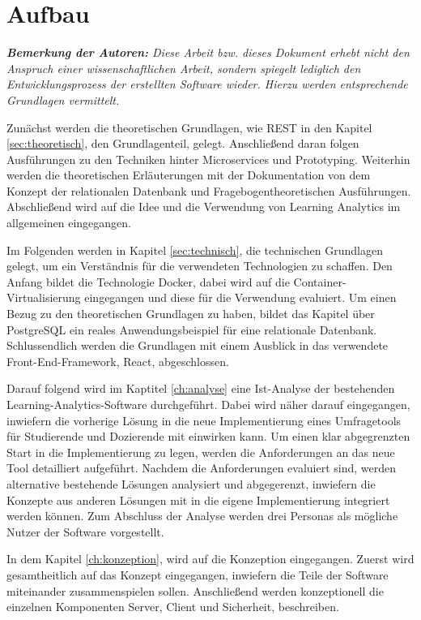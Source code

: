 \section{Aufbau}

\textit{\textbf{Bemerkung der Autoren:}
Diese Arbeit bzw. dieses Dokument erhebt nicht den Anspruch einer wissenschaftlichen Arbeit, sondern spiegelt lediglich den Entwicklungsprozess der erstellten Software wieder. 
Hierzu werden entsprechende Grundlagen vermittelt.}

Zunächst werden die theoretischen Grundlagen, wie \ac{REST} in den Kapitel \vref{sec:theoretisch}, den Grundlagenteil, gelegt.
Anschließend daran folgen Ausführungen zu den Techniken hinter Microservices und Prototyping.
Weiterhin werden die theoretischen Erläuterungen mit der Dokumentation von dem Konzept der relationalen Datenbank und Fragebogentheoretischen Ausführungen. 
Abschließend wird auf die Idee und die Verwendung von Learning Analytics im allgemeinen eingegangen. 

Im Folgenden werden in Kapitel \vref{sec:technisch}, die technischen Grundlagen gelegt, um ein Verständnis für die verwendeten Technologien zu schaffen. 
Den Anfang bildet die Technologie Docker, dabei wird auf die Container-Virtualisierung eingegangen und diese für die Verwendung evaluiert. %
Um einen Bezug zu den theoretischen Grundlagen zu haben, bildet das Kapitel über PostgreSQL ein reales Anwendungsbeispiel für eine relationale Datenbank.  
Schlussendlich werden die Grundlagen mit einem Ausblick in das verwendete Front-End-Framework, React, abgeschlossen. 

Darauf folgend wird im Kaptitel \vref{ch:analyse} eine Ist-Analyse der bestehenden Learning-Analytics-Software durchgeführt. 
Dabei wird näher darauf eingegangen, inwiefern die vorherige Lösung in die neue Implementierung eines Umfragetools für Studierende und Dozierende mit einwirken kann. 
Um einen klar abgegrenzten Start in die Implementierung zu legen, werden die Anforderungen an das neue Tool detailliert aufgeführt. 
Nachdem die Anforderungen evaluiert sind, werden alternative bestehende Lösungen analysiert und abgegerenzt, inwiefern die Konzepte aus anderen Lösungen mit in die eigene Implementierung integriert werden können. 
Zum Abschluss der Analyse werden drei Personas als mögliche Nutzer der Software vorgestellt.

In dem Kapitel \vref{ch:konzeption}, wird auf die Konzeption eingegangen. 
Zuerst wird gesamtheitlich auf das Konzept eingegangen, inwiefern die Teile der Software miteinander zusammenspielen sollen. 
Anschließend werden konzeptionell die einzelnen Komponenten Server, Client und Sicherheit, beschreiben. 

